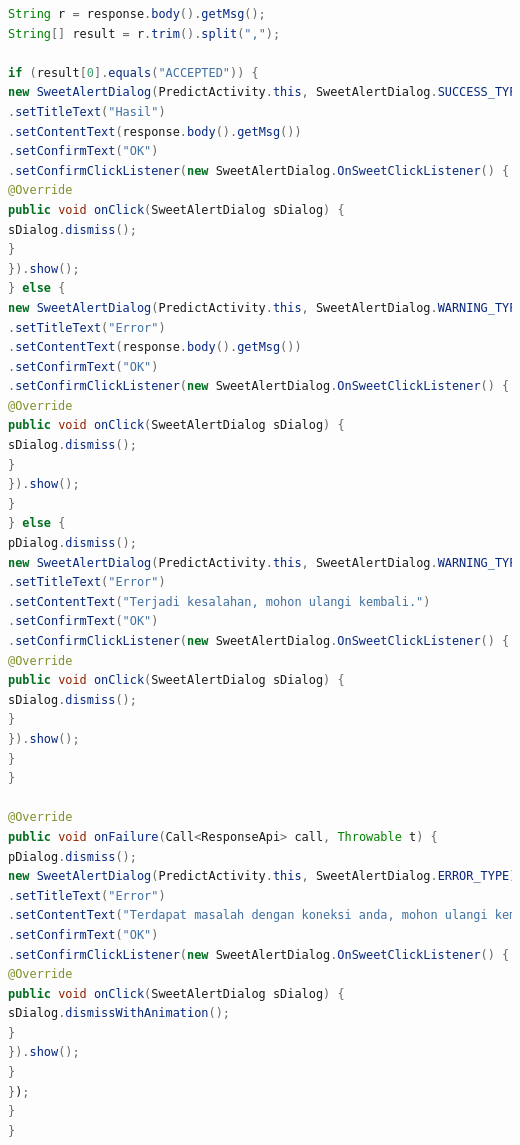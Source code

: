 \begin{lstlisting}[language=Java, caption=Implementasi Kelas PredictActivity, label=code:predict, firstnumber=48]
String r = response.body().getMsg();
String[] result = r.trim().split(",");

if (result[0].equals("ACCEPTED")) {
new SweetAlertDialog(PredictActivity.this, SweetAlertDialog.SUCCESS_TYPE)
.setTitleText("Hasil")
.setContentText(response.body().getMsg())
.setConfirmText("OK")
.setConfirmClickListener(new SweetAlertDialog.OnSweetClickListener() {
@Override
public void onClick(SweetAlertDialog sDialog) {
sDialog.dismiss();
}
}).show();
} else {
new SweetAlertDialog(PredictActivity.this, SweetAlertDialog.WARNING_TYPE)
.setTitleText("Error")
.setContentText(response.body().getMsg())
.setConfirmText("OK")
.setConfirmClickListener(new SweetAlertDialog.OnSweetClickListener() {
@Override
public void onClick(SweetAlertDialog sDialog) {
sDialog.dismiss();
}
}).show();
}
} else {
pDialog.dismiss();
new SweetAlertDialog(PredictActivity.this, SweetAlertDialog.WARNING_TYPE)
.setTitleText("Error")
.setContentText("Terjadi kesalahan, mohon ulangi kembali.")
.setConfirmText("OK")
.setConfirmClickListener(new SweetAlertDialog.OnSweetClickListener() {
@Override
public void onClick(SweetAlertDialog sDialog) {
sDialog.dismiss();
}
}).show();
}
}

@Override
public void onFailure(Call<ResponseApi> call, Throwable t) {
pDialog.dismiss();
new SweetAlertDialog(PredictActivity.this, SweetAlertDialog.ERROR_TYPE)
.setTitleText("Error")
.setContentText("Terdapat masalah dengan koneksi anda, mohon ulangi kembali.")
.setConfirmText("OK")
.setConfirmClickListener(new SweetAlertDialog.OnSweetClickListener() {
@Override
public void onClick(SweetAlertDialog sDialog) {
sDialog.dismissWithAnimation();
}
}).show();
}
});
}
}
\end{lstlisting}

